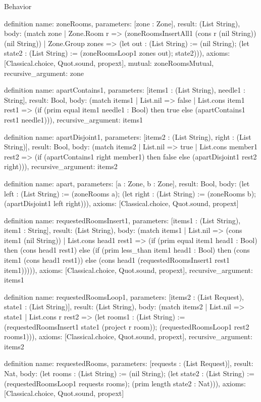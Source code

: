 \begin{lexlean}{Behavior}
\begin{semanticmodule}
definition{
  name: zoneRooms,
  parameters: [zone : Zone],
  result: (List String),
  body: (match zone
    | Zone.Room r => (zoneRoomsInsertAll1 (cons r (nil String)) (nil String))
    | Zone.Group zones => (let out : (List String) := (nil String); (let state2 : (List String) := (zoneRoomsLoop1 zones out); state2))),
  axioms: [Classical.choice, Quot.sound, propext],
  mutual: zoneRoomsMutual,
  recursive_argument: zone
}

definition{
  name: apartContains1,
  parameters: [items1 : (List String), needle1 : String],
  result: Bool,
  body: (match items1
    | List.nil => false
    | List.cons item1 rest1 => (if (prim equal item1 needle1 : Bool) then true else (apartContains1 rest1 needle1))),
  recursive_argument: items1
}

definition{
  name: apartDisjoint1,
  parameters: [items2 : (List String), right : (List String)],
  result: Bool,
  body: (match items2
    | List.nil => true
    | List.cons member1 rest2 => (if (apartContains1 right member1) then false else (apartDisjoint1 rest2 right))),
  recursive_argument: items2
}

definition{
  name: apart,
  parameters: [a : Zone, b : Zone],
  result: Bool,
  body: (let left : (List String) := (zoneRooms a); (let right : (List String) := (zoneRooms b); (apartDisjoint1 left right))),
  axioms: [Classical.choice, Quot.sound, propext]
}

definition{
  name: requestedRoomsInsert1,
  parameters: [items1 : (List String), item1 : String],
  result: (List String),
  body: (match items1
    | List.nil => (cons item1 (nil String))
    | List.cons head1 rest1 => (if (prim equal item1 head1 : Bool) then (cons head1 rest1) else (if (prim less_than item1 head1 : Bool) then (cons item1 (cons head1 rest1)) else (cons head1 (requestedRoomsInsert1 rest1 item1))))),
  axioms: [Classical.choice, Quot.sound, propext],
  recursive_argument: items1
}

definition{
  name: requestedRoomsLoop1,
  parameters: [items2 : (List Request), state1 : (List String)],
  result: (List String),
  body: (match items2
    | List.nil => state1
    | List.cons r rest2 => (let rooms1 : (List String) := (requestedRoomsInsert1 state1 (project r room)); (requestedRoomsLoop1 rest2 rooms1))),
  axioms: [Classical.choice, Quot.sound, propext],
  recursive_argument: items2
}

definition{
  name: requestedRooms,
  parameters: [requests : (List Request)],
  result: Nat,
  body: (let rooms : (List String) := (nil String); (let state2 : (List String) := (requestedRoomsLoop1 requests rooms); (prim length state2 : Nat))),
  axioms: [Classical.choice, Quot.sound, propext]
}


\end{semanticmodule}
\end{lexlean}
